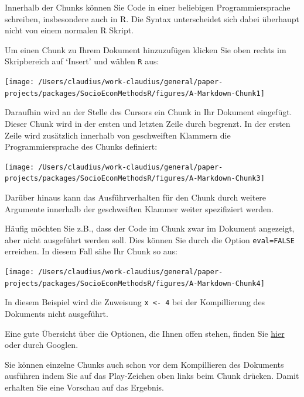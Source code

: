 \documentclass[]{book}
\begin{document}
Innerhalb der Chunks können Sie Code in einer beliebigen
Programmiersprache schreiben, insbesondere auch in R. Die Syntax
unterscheidet sich dabei überhaupt nicht von einem normalen R Skript.

Um einen Chunk zu Ihrem Dokument hinzuzufügen klicken Sie oben rechts im
Skripbereich auf `Insert' und wählen \texttt{R} aus:

\begin{center}\texttt{[image: /Users/claudius/work-claudius/general/paper-projects/packages/SocioEconMethodsR/figures/A-Markdown-Chunk1]} \end{center}

Daraufhin wird an der Stelle des Cursors ein Chunk in Ihr Dokument
eingefügt. Dieser Chunk wird in der ersten und letzten Zeile durch
\texttt{\textasciigrave{}\textasciigrave{}\textasciigrave{}} begrenzt.
In der ersten Zeile wird zusätzlich innerhalb von geschweiften Klammern
die Programmiersprache des Chunks definiert:

\begin{center}\texttt{[image: /Users/claudius/work-claudius/general/paper-projects/packages/SocioEconMethodsR/figures/A-Markdown-Chunk3]} \end{center}

Darüber hinaus kann das Ausführverhalten für den Chunk durch weitere
Argumente innerhalb der geschweiften Klammer weiter spezifiziert werden.

Häufig möchten Sie z.B., dass der Code im Chunk zwar im Dokument
angezeigt, aber nicht ausgeführt werden soll. Dies können Sie durch die
Option \texttt{eval=FALSE} erreichen. In diesem Fall sähe Ihr Chunk so
aus:

\begin{center}\texttt{[image: /Users/claudius/work-claudius/general/paper-projects/packages/SocioEconMethodsR/figures/A-Markdown-Chunk4]} \end{center}

In diesem Beispiel wird die Zuweisung \texttt{x\ \textless{}-\ 4} bei
der Kompillierung des Dokuments nicht ausgeführt.

Eine gute Übersicht über die Optionen, die Ihnen offen stehen, finden
Sie
\href{https://rstudio.com/wp-content/uploads/2015/03/rmarkdown-reference.pdf}{hier}
oder durch Googlen.

Sie können einzelne Chunks auch schon vor dem Kompillieren des Dokuments
ausführen indem Sie auf das Play-Zeichen oben links beim Chunk drücken.
Damit erhalten Sie eine Vorschau auf das Ergebnis.
\end{document}
